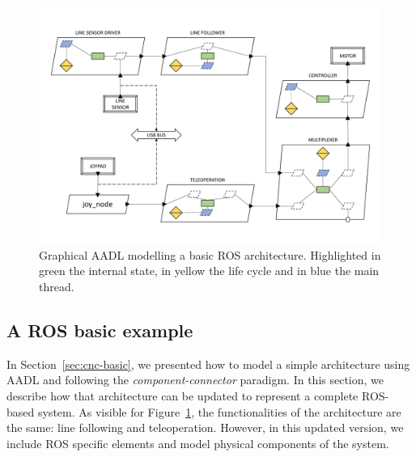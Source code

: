\begin{landscape}
	\begin{figure}[t]
	\centering
	\includegraphics[height=0.88\textwidth]{gfx/arch_figures-15}
	\caption[Graphical AADL modelling a basic ROS architecture.]{Graphical AADL modelling a basic ROS architecture. Highlighted in green the internal state, in yellow the life cycle and in blue the main thread.}
	\label{fig:ros-arch}
	\end{figure}
\end{landscape}

\subsection{A ROS basic example}
In Section~\ref{sec:cnc-basic}, we presented how to model a simple architecture using AADL and following the \textit{component-connector} paradigm. In this section, we describe how that architecture can be updated to represent a complete ROS-based system. As visible for Figure~\ref{fig:ros-arch}, the functionalities of the architecture are the same: line following and teleoperation. However, in this updated version, we include ROS specific elements and model physical components of the system.

